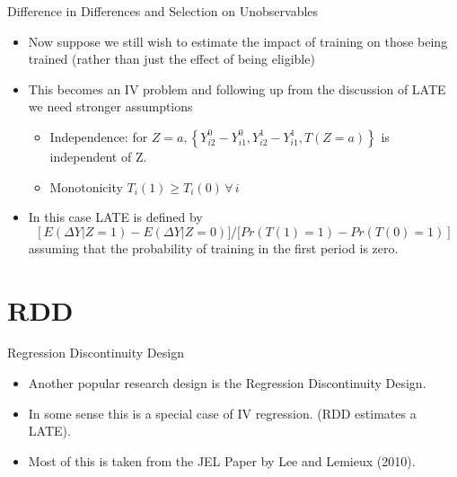 \begin{frame}{Difference in Differences and Selection on Unobservables}
\begin{itemize}
\item Now suppose we still wish to estimate the impact of training on those being trained (rather than just the effect of being eligible)
\item This becomes an IV problem and following up from the discussion of LATE we need stronger assumptions
\begin{itemize}
\item  Independence: for $Z = a, \left\{Y_{i2}^0 - Y_{i1}^0, Y_{i2}^1 - Y_{i1}^1, T(Z=a)\right\}$ is independent of Z.
\item Monotonicity $T_i(1) \ge T_i(0) \, \forall \, i$
\end{itemize}
\item In this case LATE is defined by
 $$\left [E(\Delta Y | Z = 1) - E(\Delta Y | Z = 0)] / [Pr(T(1) = 1) - Pr(T(0) = 1) \right]$$
assuming that the probability of training in the first period is zero.
\end{itemize}              
\end{frame}

\section{RDD}
\begin{frame}{Regression Discontinuity Design}
\begin{itemize}
\item Another popular research design is the \alert{Regression Discontinuity Design}.
\item In some sense this is a special case of IV regression. (RDD estimates a LATE).
\item Most of this is taken from the JEL Paper by Lee and Lemieux (2010).
\end{itemize}              
\end{frame}

